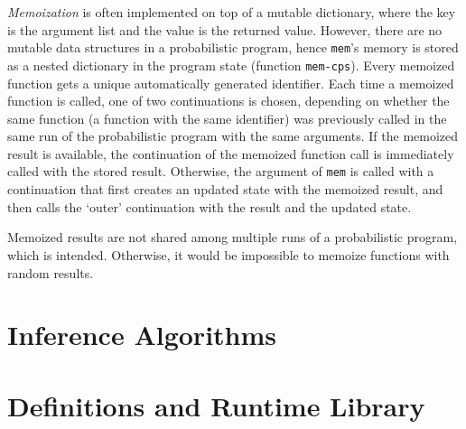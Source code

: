\documentclass[a4paper]{article}
\begin{document}
\textit{Memoization} is often implemented on top of a mutable
dictionary, where the key is the argument list and the value is
the returned value. However, there are no mutable data
structures in a probabilistic program, hence \texttt{mem}'s
memory is stored as a nested dictionary in the program state
(function \texttt{mem-cps}).  Every memoized function gets a
unique automatically generated identifier. Each time a memoized
function is called, one of two continuations is chosen,
depending on whether the same function (a function with the same
identifier) was previously called in the same run of the
probabilistic program with the same arguments. If the memoized
result is available, the continuation of the memoized function
call is immediately called with the stored result. Otherwise,
the argument of \texttt{mem} is called with a continuation that
first creates an updated state with the memoized result, and
then calls the `outer' continuation with the result and the
updated state. 

Memoized results are not shared among multiple runs of a
probabilistic program, which is intended. Otherwise, it would be
impossible to memoize functions with random results.

\section{Inference Algorithms}

\section{Definitions and Runtime Library}




\end{document}
